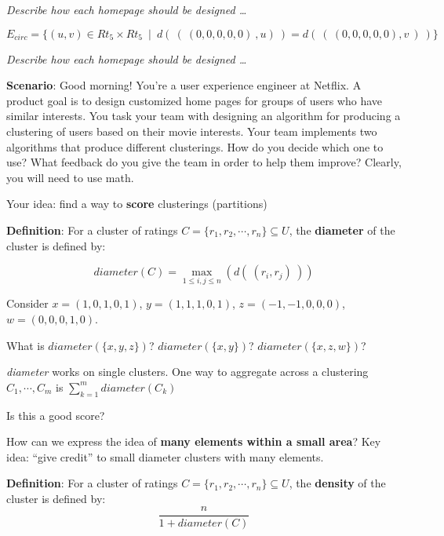 \documentclass[12pt, oneside]{article}
\begin{document}
{\it Describe how each homepage should be designed \ldots }

\vspace{100pt}

\[
E_{circ} =  \{ (u,v) \in Rt_5 \times Rt_5 ~\mid~ d(~ ( ~(0,0,0,0,0)~, u)~ ) =  d( ~(~(0,0,0,0,0),v~)~) \}
\]

{\it Describe how each homepage should be designed \ldots }


\vspace{100pt}


{\bf Scenario}: Good morning! You're a user experience engineer at Netflix. A
product goal is to design customized home pages for groups of users who have
similar interests. You task your team with designing an algorithm for
producing a clustering of users based on their movie interests. Your team
implements two algorithms that produce different clusterings. How do you
decide which one to use? What feedback do you give the team in order to help
them improve? Clearly, you will need to use math.


Your idea: find a way to {\bf score} clusterings (partitions) 


{\bf Definition}: For a cluster of ratings $C = \{r_1, r_2, \cdots, r_n \} 
\subseteq U$, the {\bf diameter} of the cluster is defined by:

$$\textit{diameter}(C) = \max_{1 \leq i, j \leq n} (d(~(r_i, r_j)~))$$ 

Consider $x = (1, 0, 1, 0, 1)$, $y = (1, 1, 1, 0, 1)$, $z = (-1, -1, 0, 0, 0)$, $w = (0, 0, 0, 1, 0)$.

What is $\textit{diameter}(\{x, y, z\})$? $\textit{diameter}(\{x, y\})$? $\textit{diameter}(\{x, z, w\})$?

\vspace{100pt}

\textit{diameter} works on single clusters. One way to aggregate across a
clustering $C_1, \cdots, C_m$ is $\sum_{k=1}^m diameter(C_k)$


Is this a good score?

\vspace{100pt}

How can we express the idea of {\bf many elements within a small area}? Key idea: ``give credit'' to small diameter clusters with many elements.

{\bf Definition}: For a cluster of ratings $C = \{r_1, r_2, \cdots, r_n \} 
\subseteq U$, the {\bf density} of the cluster is defined by:
\[
    \frac{n}{1+ diameter(C)}
\]
\end{document}
